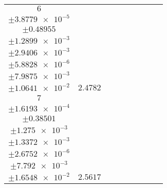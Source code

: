 \documentclass[8pt]{article}
\begin{document}
\begin{longtable}[l]{c c c c c c c c c}
$\num{6}$ & \begin{tabular}[c]{@{}c@{}}$\num{2.959e-2}$ \\ $\pm\num{3.8779e-5}$\end{tabular} & \begin{tabular}[c]{@{}c@{}}$\num{0.5027}$ \\ $\pm\num{0.48955}$\end{tabular} & \begin{tabular}[c]{@{}c@{}}$\num{7.0656}$ \\ $\pm\num{1.2899e-3}$\end{tabular} & \begin{tabular}[c]{@{}c@{}}$\num{1.1868e+3}$ \\ $\pm\num{2.9406e-3}$\end{tabular} & \begin{tabular}[c]{@{}c@{}}$\num{2.3743}$ \\ $\pm\num{5.8828e-6}$\end{tabular} & \begin{tabular}[c]{@{}c@{}}$\num{1.144}$ \\ $\pm\num{7.9875e-3}$\end{tabular} & \begin{tabular}[c]{@{}c@{}}$\num{4.0824}$ \\ $\pm\num{1.0641e-2}$\end{tabular} & $\num{2.4782}$\\
$\num{7}$ & \begin{tabular}[c]{@{}c@{}}$\num{2.9999e-2}$ \\ $\pm\num{1.6193e-4}$\end{tabular} & \begin{tabular}[c]{@{}c@{}}$\num{0.42142}$ \\ $\pm\num{0.38501}$\end{tabular} & \begin{tabular}[c]{@{}c@{}}$\num{7.284}$ \\ $\pm\num{1.275e-3}$\end{tabular} & \begin{tabular}[c]{@{}c@{}}$\num{1.1871e+3}$ \\ $\pm\num{1.3372e-3}$\end{tabular} & \begin{tabular}[c]{@{}c@{}}$\num{2.3749}$ \\ $\pm\num{2.6752e-6}$\end{tabular} & \begin{tabular}[c]{@{}c@{}}$\num{1.1573}$ \\ $\pm\num{7.792e-3}$\end{tabular} & \begin{tabular}[c]{@{}c@{}}$\num{4.0217}$ \\ $\pm\num{1.6548e-2}$\end{tabular} & $\num{2.5617}$\\

\end{longtable}
\end{document}
